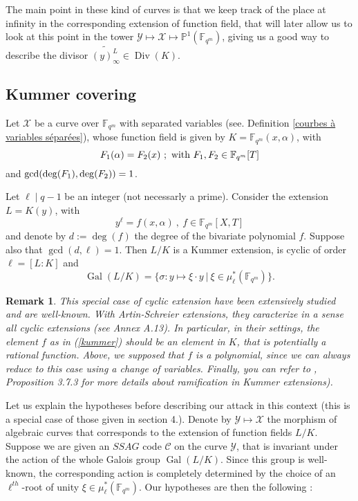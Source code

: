 \documentclass[10pt]{article}
\newtheorem{rq1}[thm]{Remark}
\newcommand{\s}{\vspace{0.3cm}}
\newcommand{\cd}{\cdot}
\newcommand{\PP}{\mathbb{P}}
\newcommand{\fqm}{\mathbb{F}_{q^m}}
\newcommand{\X}{\mathcal{X}}
\newcommand{\Y}{\mathcal{Y}}
\newcommand{\Div}{\operatorname{Div}}
\newcommand{\Gal}{\operatorname{Gal}}
\begin{document}
The main point in these kind of curves is that we keep track of the place at infinity in the corresponding extension of function field, that will later allow us to look at this point in the tower $\Y \longmapsto \X \longmapsto \PP^1(\fqm)$, giving us a good way to describe the divisor $\widetilde{(y)_{\infty}^L} \in \Div(K)$.


\s

\subsection{Kummer covering}

\s

Let $\X$ be a curve over $\fqm$ with separated variables (see. Definition \ref{courbes à variables séparées}), whose function field is given by $K=\fqm(x,\alpha)$, with
\[F_1(\alpha) = F_2(x) \ ; \textrm{ with }  F_1,F_{\rm 2} \in \fqm[T] \]
and $\gcd(\deg(F_1),\deg(F_{\rm{2}}))=1$. 

\s

Let $\ell \mid q-1$ be an integer (not necessarly a prime). Consider the extension $L=K(y)$, with
\begin{equation} \label{kummer}
y^{\ell} = f(x,\alpha) \ , \ f \in \fqm[X,T] 
\end{equation}
and denote by $d:=\deg(f)$ the degree of the bivariate polynomial $f$. Suppose also that $\gcd(d,\ell)=1$. Then $L/K$ is a Kummer extension, is cyclic of order $\ell=[L:K]$ and 
\[\Gal(L/K) = \{ \sigma : y \mapsto \xi \cd y \ | \ \xi \in \mu^*_{\ell}(\fqm)\}.\] 

\s

\begin{rq1} \label{pk des polynômes}
This special case of cyclic extension have been extensively studied and are well-known. With Artin-Schreier extensions, they caracterize in a sense all cyclic extensions (see \cite{Sti} Annex A.13). In particular, in their settings, the element $f$ as in (\ref{kummer}) should be an element in $K$, that is potentially a rational function. Above, we supposed that $f$ is a polynomial, since we can always reduce to this case using a change of variables. Finally, you can refer to \cite{Sti}, Proposition 3.7.3 for more details about ramification in Kummer extensions).
\end{rq1}

\s

Let us explain the hypotheses before describing our attack in this context (this is a special case of those given in section 4.). Denote by $\Y \longmapsto \X$ the morphism of algebraic curves that corresponds to the extension of function fields $L/K$. Suppose we are given an $SSAG$ code $\mathcal{C}$ on the curve $\Y$, that is invariant under the action of the whole Galois group $\Gal(L/K)$. Since this group is well-known, the corresponding action is completely determined by the choice of an $\ell^{th}$-root of unity $\xi \in \mu^*_{\ell}(\fqm)$. Our hypotheses are then the following :
\end{document}
